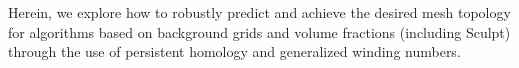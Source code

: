 %


Herein, we explore how to robustly predict and achieve the desired mesh topology for algorithms based on background grids and volume fractions (including Sculpt) 
 through the use of persistent homology and generalized winding numbers.


